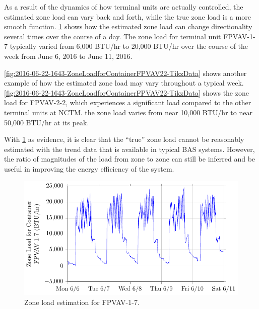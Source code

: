 As a result of the dynamics of how  terminal units are actually controlled, the estimated zone load can vary back and forth, while the true zone load is a more smooth function. \figref{} \ref{fig:2016-06-22-1654-ZoneLoadforContainerFPVAV17-TikzData} shows how the estimated zone load can change directionality several times over the course of a day. The zone load for terminal unit FPVAV-1-7 typically varied from 6,000 BTU/hr to 20,000 BTU/hr over the course of the week from June 6, 2016 to June 11, 2016.

\figref{} \ref{fig:2016-06-22-1643-ZoneLoadforContainerFPVAV22-TikzData} shows another example of how the estimated zone load may vary throughout a typical week. \figref{} \ref{fig:2016-06-22-1643-ZoneLoadforContainerFPVAV22-TikzData} shows the zone load for FPVAV-2-2, which experiences a significant load compared to the other terminal units at NCTM. the zone load varies from near 10,000 BTU/hr to near 50,000 BTU/hr at its peak.

With \figref{} \ref{fig:2016-06-22-1654-ZoneLoadforContainerFPVAV17-TikzData} as evidence, it is clear that the ``true'' zone load cannot be reasonably estimated with the trend data that is available in typical BAS systems. However, the ratio of magnitudes of the load from zone to zone can still be inferred and be useful in improving the energy efficiency of the system.  

\begin{figure}
\centering
\includegraphics[]{Plots/2016-06-22-1654-ZoneLoadforContainerFPVAV17-TikzData.pdf}
\caption{Zone load estimation for FPVAV-1-7.}
\label{fig:2016-06-22-1654-ZoneLoadforContainerFPVAV17-TikzData}
\end{figure}

